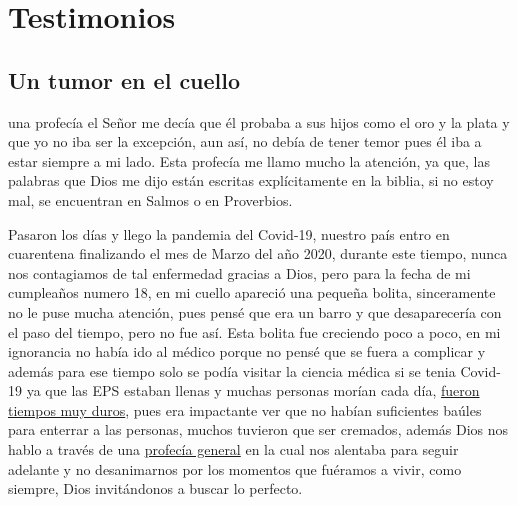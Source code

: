 \part*{Testimonios}


\chapter*{Un tumor en el cuello} 

 una profecía el Señor me decía que él probaba a sus hijos como el oro y la plata y que yo no iba ser la excepción, aun así, no debía de tener temor pues él iba a estar siempre a mi lado. Esta profecía me llamo mucho la atención, ya que, las palabras que Dios me dijo están escritas explícitamente en la biblia, si no estoy mal, se encuentran en Salmos o en Proverbios.

Pasaron los días y llego la pandemia del Covid-19, nuestro país entro en cuarentena finalizando el mes de Marzo del año 2020, durante este tiempo, nunca nos contagiamos de tal enfermedad gracias a Dios, pero para la fecha de mi cumpleaños numero 18, en mi cuello apareció una pequeña bolita, sinceramente no le puse mucha atención, pues pensé que era un barro y que desaparecería con el paso del tiempo, pero no fue así. Esta bolita fue creciendo poco a poco, en mi ignorancia no había ido al médico porque no pensé que se fuera a complicar y además para ese tiempo solo se podía visitar la ciencia médica si se tenia Covid-19 ya que las EPS estaban llenas y muchas personas morían cada día, \href{https://youtu.be/4CHanebIMGM}{fueron tiempos muy duros}, pues era impactante ver que no habían suficientes baúles para enterrar a las personas, muchos tuvieron que ser cremados, además Dios nos hablo a través de una \href{https://idmji.org/oracion-y-profecia-hna-maria-luisa-piraquive-fort-lauderdale-fl-usa-12-marzo-2020/}{profecía general} en la cual nos alentaba para seguir adelante y no desanimarnos por los momentos que fuéramos a vivir, como siempre, Dios invitándonos a buscar lo perfecto.

